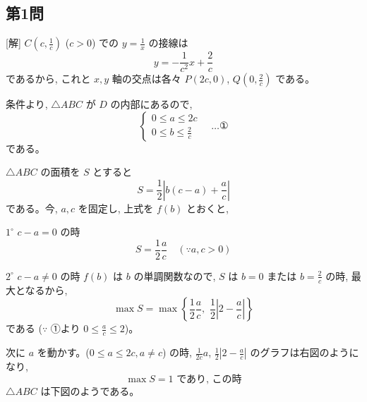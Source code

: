\documentclass[../main.tex]{subfiles}
\begin{document}
\subsection*{第1問}

[解] $C\left(c, \frac{1}{c}\right)$ ($c > 0$) での $y = \frac{1}{x}$ の接線は
\[
  y = -\frac{1}{c^2} x + \frac{2}{c}
\]
であるから, これと $x, y$ 軸の交点は各々 $P(2c, 0)$, $Q\left(0, \frac{2}{c}\right)$ である。

条件より, $\triangle ABC$ が $D$ の内部にあるので,
\[
  \begin{cases}
    0 \le a \le 2c \\
    0 \le b \le \frac{2}{c}
  \end{cases} \quad \dots \text{①}
\]
である。

\noindent
[★以下, 解1] $\triangle ABC$ の面積を $S$ とすると
\[
  S = \frac{1}{2} \left| b(c - a) + \frac{a}{c} \right|
\]
である。今, $a, c$ を固定し, 上式を $f(b)$ とおくと,

$1^\circ$ $c - a = 0$ の時
\[
  S = \frac{1}{2} \frac{a}{c} \quad (\because a, c > 0)
\]

$2^\circ$ $c - a \ne 0$ の時
$f(b)$ は $b$ の単調関数なので, $S$ は $b = 0$ または $b = \frac{2}{c}$ の時, 最大となるから,
\[
  \max S = \max \left\{ \frac{1}{2} \frac{a}{c}, \,\, \frac{1}{2}\left|2 - \frac{a}{c}\right| \right\}
\]
である ($\because$ ①より $0 \le \frac{a}{c} \le 2$)。

次に $a$ を動かす。($0 \le a \le 2c, a \ne c$) の時, $\frac{1}{2c} a$, $\frac{1}{2}\left|2 - \frac{a}{c}\right|$ のグラフは右図のようになり,
\[
  \max S = 1 \text{ であり, この時}
\]
$\triangle ABC$ は下図のようである。
\end{document}
